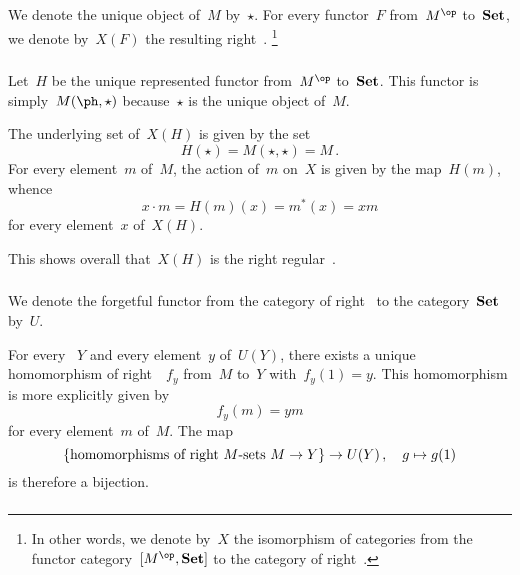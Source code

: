 \subsection{}


We denote the unique object of~$M$ by~$\star$.
For every functor~$F$ from~$M^{\op}$ to~$\mathbf{Set}$, we denote by~$X(F)$ the resulting right~.%
\footnote{
	In other words, we denote by~$X$ the isomorphism of categories from the functor category~$[M^{\op}, \Set]$ to the category of right~.
}



\subsubsection{}

Let~$H$ be the unique represented functor from~$M^{\op}$ to~$\mathbf{Set}$.
This functor is simply~$M(\ph, \star)$ because~$\star$ is the unique object of~$M$.

The underlying set of~$X(H)$ is given by the set
\[
	H(\star)
	=
	M(\star, \star)
	=
	M \,.
\]
For every element~$m$ of~$M$, the action of~$m$ on~$X$ is given by the map~$H(m)$, whence
\[
	x ⋅ m
	=
	H(m)(x)
	=
	m^*(x)
	=
	x m
\]
for every element~$x$ of~$X(H)$.

This shows overall that~$X(H)$ is the right regular~.



\subsubsection{}

We denote the forgetful functor from the category of right~ to the category~$\mathbf{Set}$ by~$U$.

For every ~$Y$ and every element~$y$ of~$U(Y)$, there exists a unique homomorphism of right~~$f_y$ from~$M$ to~$Y$ with~$f_y(1) = y$.
This homomorphism is more explicitly given by
\[
	f_y(m) = ym
\]
for every element~$m$ of~$M$.
The map
\[
	\{ \text{homomorphisms of right~\sets{$M$}~$\textstyle M \to Y$} \} \to U(Y) \,,
	\quad
	g \mapsto g(1)
\]
is therefore a bijection.



\subsubsection{}

